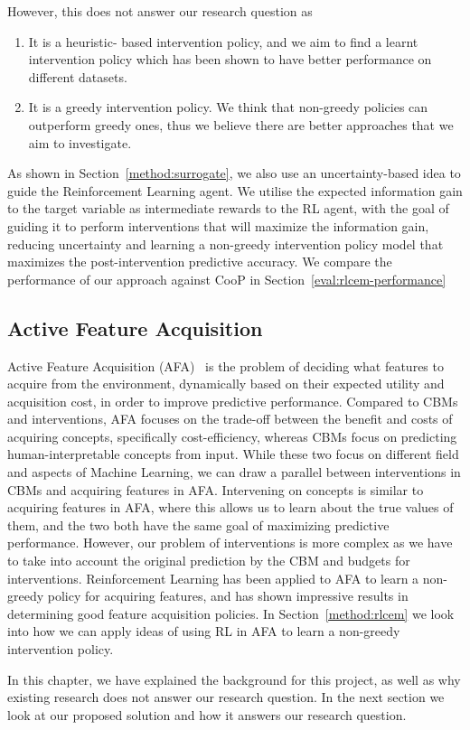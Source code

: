 However, this does not answer our research question as
\begin{enumerate}
    \item It is a heuristic-
    based intervention policy, and we aim to find a learnt intervention
    policy which has been shown to have better performance on different 
    datasets.
    \item It is a greedy intervention policy. We think that non-greedy
    policies can outperform greedy ones, thus we believe there are better
    approaches that we aim to investigate.
\end{enumerate}

As shown in Section~\ref{method:surrogate},
we also use an uncertainty-based
idea to guide the Reinforcement Learning agent.
We utilise the expected information gain to the target variable
as intermediate rewards to the RL agent, with the goal of guiding it to 
perform interventions that will maximize the information gain, reducing
uncertainty and learning a non-greedy intervention policy model
that maximizes the post-intervention predictive accuracy. We compare 
the performance of our approach against CooP in Section~\ref{eval:rlcem-performance}


\subsection{Active Feature Acquisition}\label{background:afa}
Active Feature Acquisition (AFA)~\cite{afa} is the problem of deciding
what features to acquire from the environment, dynamically based
on their expected utility and acquisition cost, in order to 
improve predictive performance. Compared to
CBMs and interventions, AFA focuses on 
the trade-off between the benefit and costs of acquiring concepts,
specifically cost-efficiency, whereas
CBMs focus on predicting human-interpretable concepts 
from input. While these two focus on different field and aspects
of Machine Learning, we can draw a parallel between
interventions in CBMs and acquiring features in AFA.
Intervening on concepts is similar to acquiring features in AFA,
where this allows us to learn about the true values of them,
and the two both have the same goal of maximizing predictive performance.
However, our problem of interventions is more complex as we have to take
into account the original prediction by the CBM and budgets for interventions.
Reinforcement Learning has been applied to AFA to learn a non-greedy
policy for acquiring features, and has shown impressive results
in determining good feature acquisition policies.
In Section~\ref{method:rlcem} we look into how we can apply ideas of using
RL in AFA to learn a non-greedy intervention policy.


In this chapter, we have explained the 
background for this project, as well as why existing research
does not answer our research question. In the next section
we look at our proposed solution and how it answers our research question.

